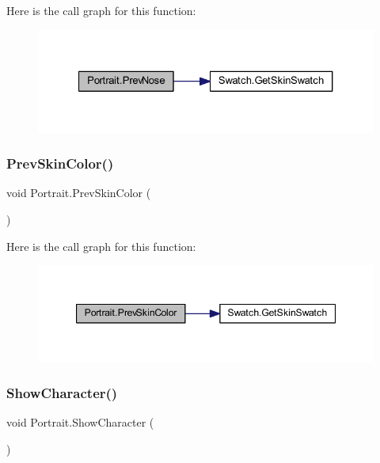 Here is the call graph for this function\+:\nopagebreak
\begin{figure}[H]
\begin{center}
\leavevmode
\includegraphics[width=327pt]{class_portrait_afc5cd84e6086e462adb30f0d988c76b6_cgraph}
\end{center}
\end{figure}
\mbox{\label{class_portrait_acbaf5360b4efe38e96ae08816ee94ccb}} 
\subsubsection{\texorpdfstring{PrevSkinColor()}{PrevSkinColor()}}
{\footnotesize\ttfamily void Portrait.\+Prev\+Skin\+Color (\begin{DoxyParamCaption}{ }\end{DoxyParamCaption})}

Here is the call graph for this function\+:\nopagebreak
\begin{figure}[H]
\begin{center}
\leavevmode
\includegraphics[width=347pt]{class_portrait_acbaf5360b4efe38e96ae08816ee94ccb_cgraph}
\end{center}
\end{figure}
\mbox{\label{class_portrait_ab8365d52d39bacdb043a5f707e9c17ef}} 
\subsubsection{\texorpdfstring{ShowCharacter()}{ShowCharacter()}}
{\footnotesize\ttfamily void Portrait.\+Show\+Character (\begin{DoxyParamCaption}{ }\end{DoxyParamCaption})}

